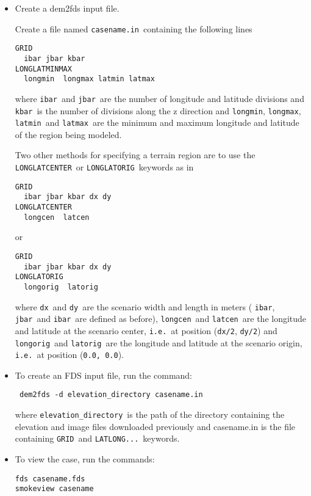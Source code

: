 \begin{itemize}
\item Create a dem2fds input file.

Create a file named {\tt casename.in}\ containing the following lines

\begin{verbatim}
GRID
  ibar jbar kbar
LONGLATMINMAX
  longmin  longmax latmin latmax
\end{verbatim}

where {\tt ibar}\ and {\tt jbar}\ are the number of longitude and latitude divisions
and {\tt kbar}\ is the number of divisions along the z direction and
{\tt longmin}, {\tt longmax}, {\tt latmin}\ and {\tt latmax}\
are the minimum and maximum
longitude and latitude of the region  being modeled.

Two other methods for specifying a terrain region are to use the
{\tt LONGLATCENTER}\ or {\tt LONGLATORIG}\ keywords as in

\begin{verbatim}
GRID
  ibar jbar kbar dx dy
LONGLATCENTER
  longcen  latcen
\end{verbatim}

or

\begin{verbatim}
GRID
  ibar jbar kbar dx dy
LONGLATORIG
  longorig  latorig
\end{verbatim}

where {\tt dx}\ and {\tt dy}\ are the scenario width and length in meters
( {\tt ibar}, {\tt jbar}\ and {\tt ibar}\ are defined as before),
{\tt longcen}\ and {\tt latcen}\ are the longitude and
latitude at the scenario center,
{\tt i.e.}\ at position ({\tt dx/2}, {\tt dy/2})
and {\tt longorig}\ and {\tt latorig}\ are the longitude and
latitude at the scenario origin,
{\tt i.e.}\ at position ({\tt 0.0, 0.0}).

\item To create an FDS input file, run the command:
\begin{verbatim}
 dem2fds -d elevation_directory casename.in
\end{verbatim}
where {\tt elevation\_directory}\ is the path of the directory containing the
elevation and image files downloaded previously and
casename.in is the file containing {\tt GRID}\ and {\tt LATLONG...}\ keywords.

\item To view the case, run the commands:
\begin{verbatim}
fds casename.fds
smokeview casename
\end{verbatim}
\end{itemize}

